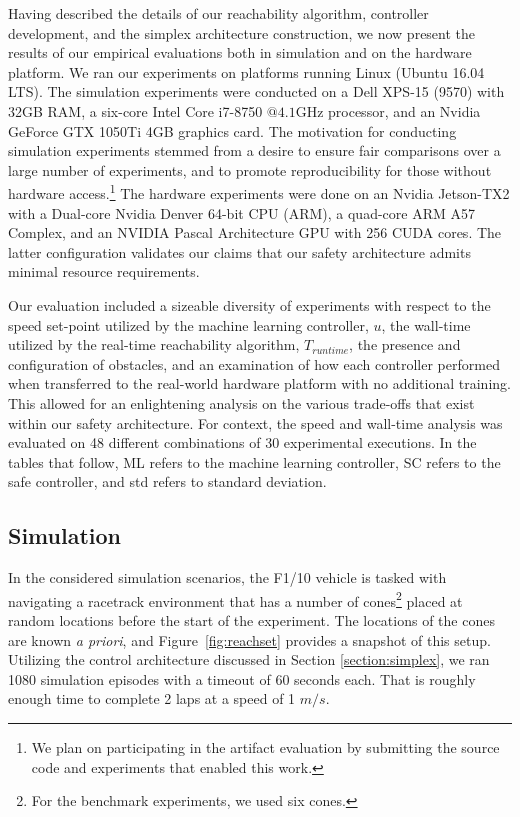 \documentclass[manuscript,screen,review]{acmart}
\begin{document}
Having described the details of our reachability algorithm, controller development, and the simplex architecture construction, we now present the results of our empirical evaluations both in simulation and on the hardware platform. We ran our experiments on platforms running Linux (Ubuntu 16.04 LTS). The simulation experiments were conducted on a Dell XPS-15 (9570) with 32GB RAM, a six-core Intel Core i7-8750 $@ 4.1\textrm{GHz}$ processor, and an Nvidia GeForce GTX 1050Ti 4GB graphics card. The motivation for conducting simulation experiments stemmed from a desire to ensure fair comparisons over a large number of experiments, and to promote reproducibility for those without hardware access.\footnote{We plan on participating in the artifact evaluation by submitting the source code and experiments that enabled this work.} The hardware experiments were done on an Nvidia Jetson-TX2 with a Dual-core Nvidia Denver 64-bit CPU (ARM), a quad-core ARM A57 Complex, and an NVIDIA Pascal Architecture GPU with 256 CUDA cores. The latter configuration validates our claims that our safety architecture admits minimal resource requirements. 


Our evaluation included a sizeable diversity of experiments with respect to the speed set-point utilized by the machine learning controller, $u$, the wall-time utilized by the real-time reachability algorithm, $T_{runtime}$, the presence and configuration of obstacles, and an examination of how each controller performed when transferred to the real-world hardware platform with no additional training. This allowed for an enlightening analysis on the various trade-offs that exist within our safety architecture. For context, the speed and wall-time analysis was evaluated on 48 different combinations of 30 experimental executions. %
In the tables that follow, ML refers to the machine learning controller, SC refers to the safe controller, and std refers to standard deviation. %

\subsection{Simulation}
In the considered simulation scenarios, the F1/10 vehicle is tasked with navigating a racetrack environment that has a number of cones\footnote{For the benchmark experiments, we used six cones.} placed at random locations before the start of the experiment. The locations of the cones are known \emph{a priori}, and Figure~\ref{fig:reachset} provides a snapshot of this setup. Utilizing the control architecture discussed in Section \ref{section:simplex}, we ran 1080 simulation episodes with a timeout of 60 seconds each. That is roughly enough time to complete 2 laps at a speed of 1 $m/s$. %
\end{document}
